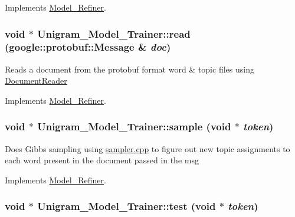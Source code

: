 Implements \hyperlink{class_model___refiner_a238a8d648f8b1c0966ea8e4cbbaa9e9e}{Model\_\-Refiner}.

\hypertarget{class_unigram___model___trainer_af4f1230edeb83227aaeee31e9f81aeeb}{
\subsubsection[{read}]{\setlength{\rightskip}{0pt plus 5cm}void $\ast$ Unigram\_\-Model\_\-Trainer::read (google::protobuf::Message \& {\em doc})}}
\label{class_unigram___model___trainer_af4f1230edeb83227aaeee31e9f81aeeb}
Reads a document from the protobuf format word \& topic files using \hyperlink{class_document_reader}{DocumentReader} 

Implements \hyperlink{class_model___refiner_ae6b2ecaaddf8aa0876cfb42bff713607}{Model\_\-Refiner}.

\hypertarget{class_unigram___model___trainer_a03d020dca2c75815773ba726c294e3d1}{
\subsubsection[{sample}]{\setlength{\rightskip}{0pt plus 5cm}void $\ast$ Unigram\_\-Model\_\-Trainer::sample (void $\ast$ {\em token})}}
\label{class_unigram___model___trainer_a03d020dca2c75815773ba726c294e3d1}
Does Gibbs sampling using \hyperlink{sampler_8cpp}{sampler.cpp} to figure out new topic assignments to each word present in the document passed in the msg 

Implements \hyperlink{class_model___refiner_a6c2ecd4d1df247352c8319e0eb17e1e2}{Model\_\-Refiner}.

\hypertarget{class_unigram___model___trainer_a959873d7b22e159694473fdbcd470785}{
\subsubsection[{test}]{\setlength{\rightskip}{0pt plus 5cm}void $\ast$ Unigram\_\-Model\_\-Trainer::test (void $\ast$ {\em token})}}
\label{class_unigram___model___trainer_a959873d7b22e159694473fdbcd470785}



